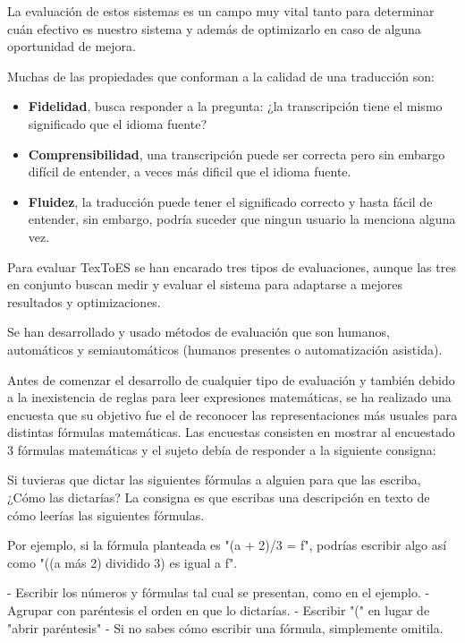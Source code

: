La evaluación de estos sistemas es un campo muy vital tanto para determinar cuán efectivo es nuestro sistema y además de optimizarlo en caso de alguna oportunidad de mejora.

Muchas de las propiedades que conforman a la calidad de una traducción son:
\begin{itemize}
\item \textbf{Fidelidad}, busca responder a la pregunta: ¿la transcripción tiene el mismo significado que el idioma fuente?
\item \textbf{Comprensibilidad}, una transcripción puede ser correcta pero sin embargo difícil de entender, a veces más dificil que el idioma fuente.
\item \textbf{Fluidez}, la traducción puede tener el significado correcto y hasta fácil de entender, sin embargo, podría suceder que ningun usuario la menciona alguna vez.
\end{itemize}

Para evaluar TexToES se han encarado tres tipos de evaluaciones, aunque las tres en conjunto buscan medir y evaluar el sistema para adaptarse a mejores resultados y optimizaciones.

Se han desarrollado y usado métodos de evaluación que son humanos, automáticos y semiautomáticos (humanos presentes o automatización asistida).

Antes de comenzar el desarrollo de cualquier tipo de evaluación y también debido a la inexistencia de reglas para leer expresiones matemáticas, se ha realizado una encuesta que su objetivo fue el de reconocer las representaciones más usuales para distintas fórmulas matemáticas. Las encuestas consisten en mostrar al encuestado 3 fórmulas matemáticas y el sujeto debía de responder a la siguiente consigna:\\

\begin{tcolorbox}
Si tuvieras que dictar las siguientes fórmulas a alguien para que las escriba, ¿Cómo las dictarías?
La consigna es que escribas una descripción en texto de cómo leerías las siguientes fórmulas.

Por ejemplo, si la fórmula planteada es "(a + 2)/3 = f", podrías escribir algo así como "((a más 2) dividido 3) es igual a f".

- Escribir los números y fórmulas tal cual se presentan, como en el ejemplo.
- Agrupar con paréntesis el orden en que lo dictarías.
- Escribir "(" en lugar de "abrir paréntesis"
- Si no sabes cómo escribir una fórmula, simplemente omitila.
\end{tcolorbox}

